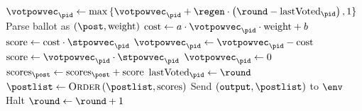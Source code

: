 \begin{algorithm}[H]
  \caption{$\textsc{HandleVote}\left(\mathrm{ballot},
  \player_{\pid}\right)$}
  \label{alg:steem:handlevote}
  \begin{algorithmic}[1]
     
      \State $\votpowvec_{\pid} \gets \max{\lbrace \votpowvec_{\pid} + \regen
      \cdot \left(\round - \mathrm{lastVoted}_{\pid}\right), 1 \rbrace}$
        \State Parse ballot as $\left(\post, \mathrm{weight}\right)$
        \State $\mathrm{cost} \gets a \cdot \votpowvec_{\pid} \cdot
        \mathrm{weight} + b$
          \State $\mathrm{score} \gets \mathrm{cost} \cdot \stpowvec_{\pid}$
          \State $\votpowvec_{\pid} \gets \votpowvec_{\pid} - \mathrm{cost}$
        \Else
          \State $\mathrm{score} \gets \votpowvec_{\pid} \cdot
          \stpowvec_{\pid}$
          \State $\votpowvec_{\pid} \gets 0$
        \EndIf
        \State $\mathrm{scores}_\post \gets \mathrm{scores}_\post +
        \mathrm{score}$
      \EndIf
      \State $\mathrm{lastVoted}_{\pid} \gets \round$
    \EndIf
      \State $\postlist \gets \textsc{Order}\left(\postlist,
      \mathrm{scores}\right)$ 
      \If{$\round = \rounds$}
        \State Send $\left(\mathtt{output}, \postlist\right)$ to $\env$
        \State Halt
      \Else
        \State $\round \gets \round + 1$
      \EndIf
    \EndIf
  \end{algorithmic}
\end{algorithm}
